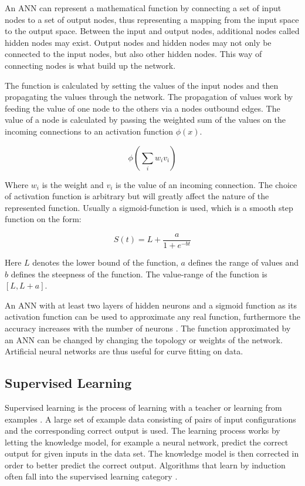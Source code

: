 An ANN can represent a mathematical function by connecting a set of input nodes to a set of output nodes, thus representing a mapping from the input space to the output space. Between the input and output nodes, additional nodes called hidden nodes may exist. Output nodes and hidden nodes may not only be connected to the input nodes, but also other hidden nodes. This way of connecting nodes is what build up the network.

The function is calculated by setting the values of the input nodes and then propagating the values through the network. The propagation of values work by feeding the value of one node to the others via a nodes outbound edges. The value of a node is calculated by passing the weighted sum of the values on the incoming connections to an activation function $\phi(x)$.

\begin{equation}
    \phi (\sum_i{w_i v_i})
\end{equation}

Where $w_i$ is the weight and $v_i$ is the value of an incoming connection. The choice of activation function is arbitrary but will greatly affect the nature of the represented function. Usually a sigmoid-function is used, which is a smooth step function on the form:

\begin{equation}
    S(t) = L + \frac{a}{1 + e^{-bt}}
\end{equation}

Here $L$ denotes the lower bound of the function, $a$ defines the range of values and $b$ defines the steepness of the function. The value-range of the function is $[L, L+a]$. 

An ANN with at least two layers of hidden neurons and a sigmoid function as its activation function can be used to approximate any real function, furthermore the accuracy increases with the number of neurons \cite{mitchel:approximation}. The function approximated by an ANN can be changed by changing the topology or weights of the network. Artificial neural networks are thus useful for curve fitting on data. 

\subsection{Supervised Learning}
Supervised learning is the process of learning with a teacher or learning from examples \cite{haykin:supervised}. A large set of example data consisting of pairs of input configurations and the corresponding correct output is used. The learning process works by letting the knowledge model, for example a neural network, predict the correct output for given inputs in the data set. The knowledge model is then corrected in order to better predict the correct output. Algorithms that learn by induction often fall into the supervised learning category \cite{glossary}. 

